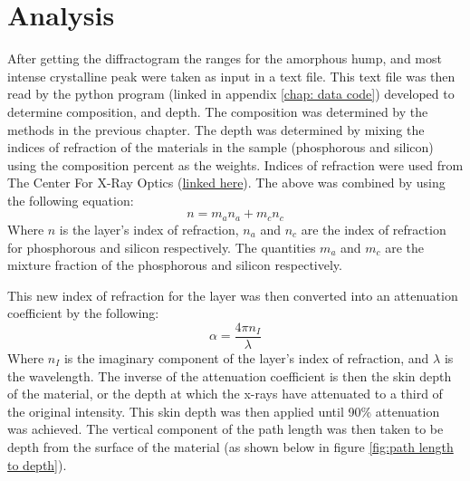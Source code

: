 \chapter{Analysis} %

    After getting the diffractogram the ranges for the amorphous hump, and most intense crystalline peak were taken as input in a text file. 
    This text file was then read by the python program (linked in appendix \ref{chap: data code}) developed to determine composition, and depth. 
    The composition was determined by the methods in the previous chapter. 
    The depth was determined by mixing the indices of refraction of the materials in the sample (phosphorous and silicon) using the composition percent as the weights. 
    Indices of refraction were used from The Center For X-Ray Optics (\href{https://henke.lbl.gov/optical_constants/getdb2.html}{linked here})\cite{refractionIndex}. 
    The above was combined by using the following equation:
    \begin{equation}
        n=m_a n_a+m_c n_c
        \label{eq: index mixing}
    \end{equation}
    Where $n$ is the layer's index of refraction, $n_a$ and $n_c$ are the index of refraction for phosphorous and silicon respectively.
    The quantities $m_a$ and $m_c$ are the mixture fraction of the phosphorous and silicon respectively.

    This new index of refraction for the layer was then converted into an attenuation coefficient by the following:
    \begin{equation}
        \alpha=\frac{4\pi n_I}{\lambda}
        \label{eq: attenuation coefficient}
    \end{equation}
    Where $n_I$ is the imaginary component of the layer's index of refraction, and $\lambda$ is the wavelength\cite{hecht}. 
    The inverse of the attenuation coefficient is then the skin depth of the material, or the depth at which the x-rays have attenuated to a third of the original intensity. 
    This skin depth was then applied until 90\% attenuation was achieved. 
    The vertical component of the path length was then taken to be depth from the surface of the material (as shown below in figure \ref{fig:path length to depth}). 


